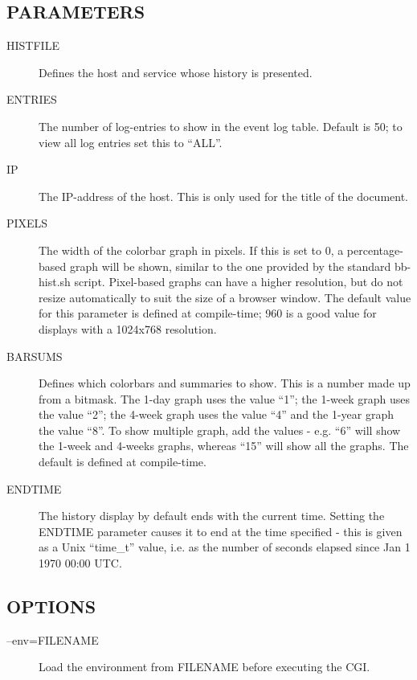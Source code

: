 \subsection{PARAMETERS}
\begin{description}

\item[HISTFILE] Defines the host and service whose history is
  presented. 

\item[ENTRIES] The number of log-entries to show in the event log
  table. Default is 50; to view all log entries set this to ``ALL''. 

\item[IP] The IP-address of the host. This is only used for the title
  of the document. 

\item[PIXELS] The width of the colorbar graph in pixels. If this is
  set to 0, a percentage-based graph will be shown, similar to the one
  provided by the standard bb-hist.sh script. Pixel-based graphs can
  have a higher resolution, but do not resize automatically to suit
  the size of a browser window. The default value for this parameter
  is defined at compile-time; 960 is a good value for displays with a
  1024x768 resolution. 

\item[BARSUMS] Defines which colorbars and summaries to show. This is
  a number made up from a bitmask. The 1-day graph uses the value
  ``1''; the 1-week graph uses the value ``2''; the 4-week graph uses
  the value ``4'' and the 1-year graph the value ``8''. To show
  multiple graph, add the values - e.g. ``6'' will show the 1-week and
  4-weeks graphs, whereas ``15'' will show all the graphs. The default
  is defined at compile-time. 

\item[ENDTIME] The history display by default ends with the current
  time. Setting the ENDTIME parameter causes it to end at the time
  specified - this is given as a Unix ``time\_t'' value, i.e. as the
  number of seconds elapsed since Jan 1 1970 00:00 UTC. 


 


\end{description}
\subsection{OPTIONS}
\begin{description}
\item[--env=FILENAME] Load the environment from FILENAME before executing the CGI. 

\end{description}
